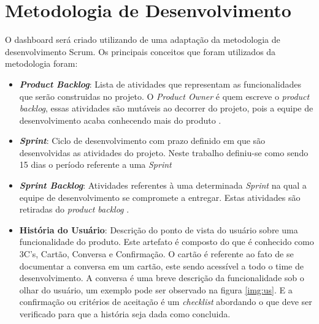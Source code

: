 \section{Metodologia de Desenvolvimento}
\label{met_desenvolvimento}
O dashboard será criado utilizando de uma adaptação da metodologia de desenvolvimento Scrum. Os principais conceitos que foram utilizados da metodologia foram:
\begin{itemize}
\item \textit{\textbf{Product Backlog}}: Lista de atividades que representam as funcionalidades que serão construidas no projeto. O \textit{Product Owner} é quem escreve o \textit{product backlog}, essas atividades são mutáveis ao decorrer do projeto, pois a equipe de desenvolvimento acaba conhecendo mais do produto \cite{sabbagh_scrum:_2014}.
\item \textit{\textbf{Sprint}}: Ciclo de desenvolvimento com prazo definido em que são desenvolvidas as atividades do projeto. Neste trabalho definiu-se como sendo 15 dias o período referente a uma \textit{Sprint}
\item \textit{\textbf{Sprint Backlog}}: Atividades referentes à uma determinada \textit{Sprint} na qual a equipe de desenvolvimento se compromete a entregar. Estas atividades são retiradas do \textit{product backlog} \cite{mahnic_case_2011}.
\item \textbf{História do Usuário}: Descrição do ponto de vista do usuário sobre uma funcionalidade do produto. Este artefato é composto do que é conhecido como 3C's, Cartão, Conversa e Confirmação. O cartão é referente ao fato de se documentar a conversa em um cartão, este sendo acessível a todo o time de desenvolvimento. A conversa é uma breve descrição da funcionalidade sob o olhar do usuário, um exemplo pode ser observado na figura \ref{img:us}. E a confirmação ou critérios de aceitação é um \textit{checklist} abordando o que deve ser verificado para que a história seja dada como concluida.
\graphicspath{{figuras/}}
\begin{figure}[h]
\centering

\end{figure}
\end{itemize}

